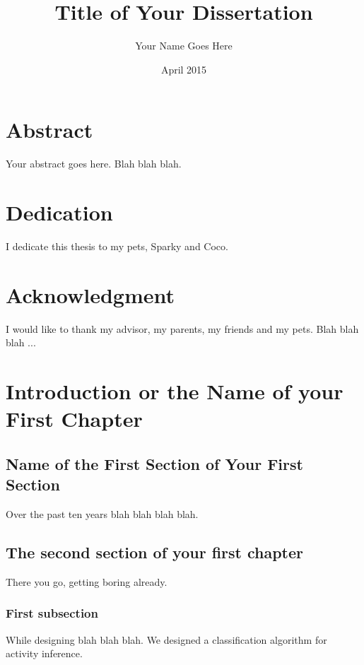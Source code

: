 \documentclass[12pt,a4paper,oneside]{book}
\title{Title of Your Dissertation}
\author{Your Name Goes Here}
\date{April 2015}
\begin{document}
\maketitle


\chapter*{Abstract}
Your abstract goes here. Blah blah blah.


\chapter*{Dedication}
I dedicate this thesis to my pets, Sparky and Coco. 


\certificateoforiginality

\chapter*{Acknowledgment}
I would like to thank my advisor, my parents, my friends and my pets. Blah blah blah ...

\tableofcontents
\listoffigures
\listoftables

\resetpagenumbering




\chapter{Introduction or the Name of your First Chapter}
\label{sec:label_of_first_chapter}

\section{Name of the First Section of Your First Section}
\label{sec:Label_of_First_Section}
%
Over the past ten years blah blah blah blah.

\section{The second section of your first chapter}
\label{sec:The_second_label}
%
There you go, getting boring already.

\subsection{First subsection}
\label{subsec:First_subsection}
%
While designing blah blah blah. We designed a classification algorithm for activity inference.
\end{document}
